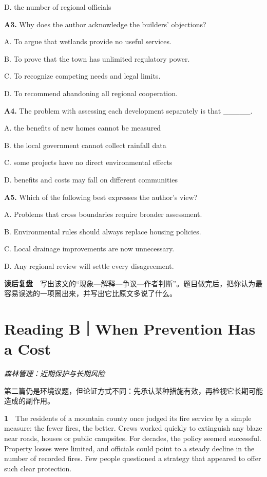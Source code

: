 \documentclass[a4paper,11pt,openany]{report}
\begin{document}
D. the number of regional officials

\textbf{A3.} Why does the author acknowledge the builders' objections?

A. To argue that wetlands provide no useful services.

B. To prove that the town has unlimited regulatory power.

C. To recognize competing needs and legal limits.

D. To recommend abandoning all regional cooperation.

\textbf{A4.} The problem with assessing each development separately is that \_\_\_\_\_.

A. the benefits of new homes cannot be measured

B. the local government cannot collect rainfall data

C. some projects have no direct environmental effects

D. benefits and costs may fall on different communities

\textbf{A5.} Which of the following best expresses the author's view?

A. Problems that cross boundaries require broader assessment.

B. Environmental rules should always replace housing policies.

C. Local drainage improvements are now unnecessary.

D. Any regional review will settle every disagreement.

\textbf{读后复盘}　写出该文的``现象---解释---争议---作者判断''。题目做完后，把你认为最容易误选的一项圈出来，并写出它比原文多说了什么。

\section{Reading B｜When Prevention Has a Cost}\label{reading-bwhen-prevention-has-a-cost}

\emph{森林管理：近期保护与长期风险}

第二篇仍是环境议题，但论证方式不同：先承认某种措施有效，再检视它长期可能造成的副作用。

\textbf{1}　The residents of a mountain county once judged its fire service by a simple measure: the fewer fires, the better. Crews worked quickly to extinguish any blaze near roads, houses or public campsites. For decades, the policy seemed successful. Property losses were limited, and officials could point to a steady decline in the number of recorded fires. Few people questioned a strategy that appeared to offer such clear protection.
\end{document}
